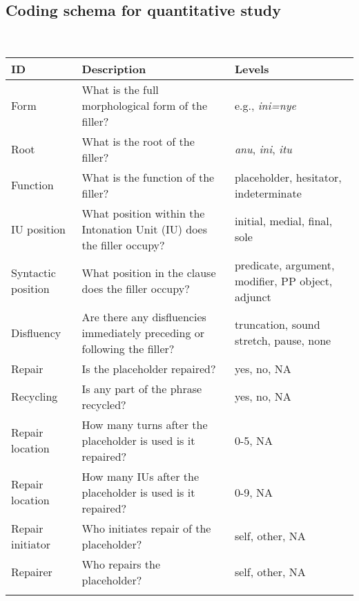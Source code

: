 \documentclass[output=paper,
\ChapterDOI{10.5281/zenodo.15697583}
colorlinks,
citecolor=brown]{langscibook}
\begin{document}
\begin{paperappendix}

\section{Coding schema for quantitative study}\label{sec:coding}
\largerpage[3]
~\vspace*{-1em}
\begin{table}[h!]
\small
\label{tab:coding}
 \begin{tabularx}{1\textwidth}{>{\raggedright}p{5em} X >{\raggedright\arraybackslash}p{9em}}
  \lsptoprule
   {ID}         &  {Description} &  {Levels}\\
  \midrule
  Form 
  & What is the full morphological form of the filler? & e.g., \textit{ini=nye} \\[20pt]
  Root  
  & What is the root of the filler? & \textit{anu}, \textit{ini}, \textit{itu}\\[15pt]
  Function
  & What is the function of the filler? & {placeholder, hesitator, indeterminate}\\[20pt]
  IU {position}
  & What position within the Intonation Unit (IU) does the filler occupy? & initial, medial, final, sole\\[20pt]
  Syntactic position
  & What position in the clause does the filler occupy? & predicate, argument, modifier, PP object, adjunct\\[25pt]
  Disfluency
  & Are there any disfluencies immediately preceding or following the filler? & {truncation, sound stretch, pause, none}\\[25pt]
  Repair
  & Is the placeholder repaired? & {yes, no, NA}\\[15pt]
  Recycling 
  & Is any part of the phrase recycled? & {yes, no, NA}\\[15pt]
  Repair location 
  & How many turns after the placeholder is used is it repaired? & {0-5, NA}\\[25pt]
  Repair location 
  & How many IUs after the placeholder is used is it repaired? & {0-9, NA}\\[25pt]
  Repair initiator &
  Who initiates repair of the placeholder? & {self, other, NA}\\[20pt]
  Repairer &
  Who repairs the placeholder? & {self, other, NA}\\
  \lspbottomrule
 \end{tabularx}
\end{table}
\end{paperappendix}
\end{document}
